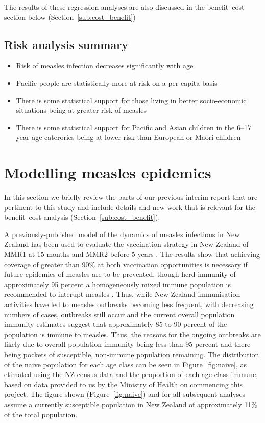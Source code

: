 \documentclass{article}
\begin{document}
The results of these regression analyses are also discussed in the benefit--cost section below (Section~\ref{sub:cost_benefit})

\subsection{Risk analysis summary}
\begin{itemize}
\item Risk of measles infection decreases significantly with age
\item Pacific people are statistically more at risk on a per capita basis
\item There is some statistical support for those living in better socio-economic situations being at greater risk of measles
\item There is some statistical support for Pacific and Asian children in the 6--17 year age caterories being at lower risk than European or Maori children
\end{itemize}

\section{Modelling measles epidemics}
\label{sec:epidemic_modelling}

In this section we briefly review the parts of our previous interim report that are pertinent to this study and include details and new work that is relevant for the benefit--cost analysis (Section~\ref{sub:cost_benefit}). 

A previously-published model of the dynamics of measles infections in New Zealand has been used to evaluate the vaccination strategy in New Zealand of MMR1 at 15 months and MMR2 before 5 years \citep{roberts0,roberts4,tobias98}. The results show that achieving coverage of greater than 90\% at both vaccination opportunities is necessary if future epidemics of measles are to be prevented, though herd immunity of approximately 95 percent a homogeneously mixed immune population is recommended to interupt measles \citep{roberts0,roberts4}. Thus, while New Zealand immunisation activities have led to measles outbreaks becoming less frequent, with decreasing numbers of cases, outbreaks still occur and the current overall population immunity estimates suggest that approximately 85 to 90 percent of the population is immune to measles. Thus, the reasons for the ongoing outbreaks are likely due to overall population immunity being less than 95 percent and there being pockets of susceptible, non-immune population remaining. The distribution of the naive population for each age class can be seen in Figure~\ref{fig:naive}, as etimated using the NZ census data \citep{stats14} and the proportion of each age class immune, based on data provided to us by the Ministry of Health on commencing this project. The figure shown (Figure~\ref{fig:naive}) and for all subsequent analyses assume a currently susceptible population in New Zealand of approximately 11\% of the total population.
\end{document}
